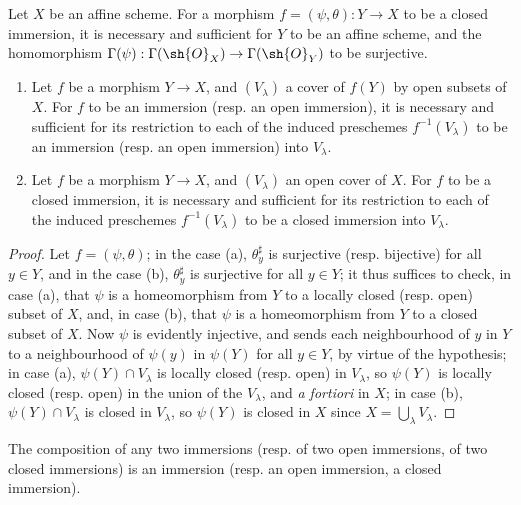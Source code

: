 \begin{corollary}[4.2.3]
\label{I.4.2.3}
Let $X$ be an affine scheme.
For a morphism $f=(\psi,\theta):Y\to X$ to be a closed immersion, it is necessary and sufficient for $Y$ to be an affine scheme, and the homomorphism $\Gamma(\psi):\Gamma(\sh{O}_X)\to\Gamma(\sh{O}_Y)$ to be surjective.
\end{corollary}

\begin{corollary}[4.2.4]
\label{I.4.2.4}
\medskip\noindent
\begin{enumerate}
  \item[{\rm(a)}] Let $f$ be a morphism $Y\to X$, and $(V_\lambda)$ a cover of $f(Y)$ by open subsets of $X$.
    For $f$ to be an immersion (resp. an open immersion), it is necessary and sufficient
    for its restriction to each of the induced preschemes $f^{-1}(V_\lambda)$ to be an immersion (resp. an open immersion) into $V_\lambda$.
  \item[{\rm(b)}] Let $f$ be a morphism $Y\to X$, and $(V_\lambda)$ an open cover of $X$.
    For $f$ to be a closed immersion, it is necessary and sufficient for its restriction to each of the induced preschemes $f^{-1}(V_\lambda)$ to be a closed immersion into $V_\lambda$.
\end{enumerate}
\end{corollary}

\begin{proof}
Let $f=(\psi,\theta)$;
in the case (a), $\theta_y^\sharp$ is surjective (resp. bijective) for all $y\in Y$, and in the case (b), $\theta_y^\sharp$ is surjective for all $y\in Y$;
it thus suffices to check, in case (a), that $\psi$ is a homeomorphism from $Y$ to a locally closed (resp. open) subset of $X$, and, in case (b), that $\psi$ is a homeomorphism from $Y$ to a closed subset of $X$.
Now $\psi$ is evidently injective, and sends each neighbourhood of $y$ in $Y$ to a neighbourhood of $\psi(y)$ in $\psi(Y)$ for all $y\in Y$, by virtue of the hypothesis;
in case (a), $\psi(Y)\cap V_\lambda$ is locally closed (resp. open) in $V_\lambda$, so $\psi(Y)$ is locally closed (resp. open) in the union of the $V_\lambda$, and \emph{a fortiori} in $X$;
in case (b), $\psi(Y)\cap V_\lambda$ is closed in $V_\lambda$, so $\psi(Y)$ is closed in $X$ since $X=\bigcup_\lambda V_\lambda$.
\end{proof}

\begin{proposition}[4.2.5]
\label{I.4.2.5}
The composition of any two immersions (resp. of two open immersions, of two closed immersions) is an immersion (resp. an open immersion, a closed immersion).
\end{proposition}


